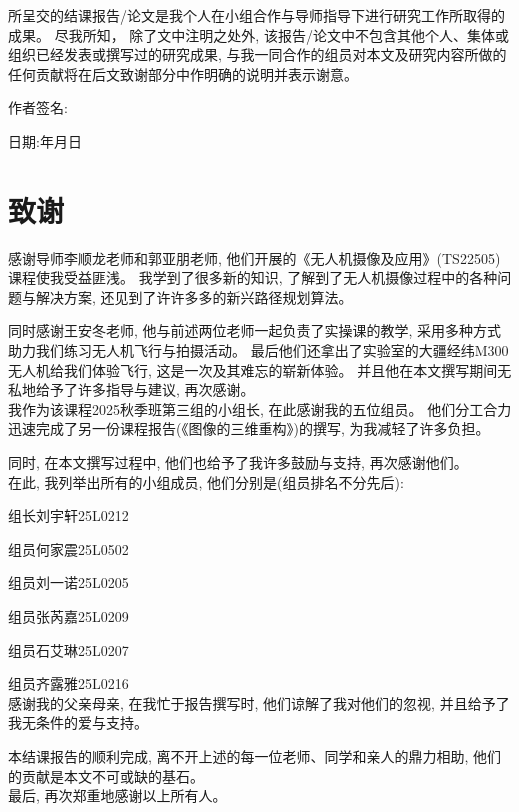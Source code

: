 \documentclass[oneside,UTF8]{ctexart}
\numberwithin{figure}{section} %
\begin{document}
所呈交的结课报告/论文是我个人在小组合作与导师指导下进行研究工作所取得的成果。
尽我所知，
除了文中注明之处外,
该报告/论文中不包含其他个人、集体或组织已经发表或撰写过的研究成果,
与我一同合作的组员对本文及研究内容所做的任何贡献将在后文致谢部分中作明确的说明并表示谢意。

作者签名:

日期:\qquad 年\qquad 月\qquad 日
\newpage\section{致谢}
感谢导师李顺龙老师和郭亚朋老师,
他们开展的《无人机摄像及应用》(TS22505)课程使我受益匪浅。
我学到了很多新的知识,
了解到了无人机摄像过程中的各种问题与解决方案,
还见到了许许多多的新兴路径规划算法。

同时感谢王安冬老师,
他与前述两位老师一起负责了实操课的教学,
采用多种方式助力我们练习无人机飞行与拍摄活动。
最后他们还拿出了实验室的大疆经纬M300无人机给我们体验飞行,
这是一次及其难忘的崭新体验。
并且他在本文撰写期间无私地给予了许多指导与建议,
再次感谢。
~\\

我作为该课程2025秋季班第三组的小组长,
在此感谢我的五位组员。
他们分工合力迅速完成了另一份课程报告(《图像的三维重构》)的撰写,
为我减轻了许多负担。

同时,
在本文撰写过程中,
他们也给予了我许多鼓励与支持,
再次感谢他们。
~\\

在此,
我列举出所有的小组成员,
他们分别是(组员排名不分先后):

\qquad 组长\quad 刘宇轩\quad 25L0212

\qquad 组员\quad 何家震\quad 25L0502

\qquad 组员\quad 刘一诺\quad 25L0205

\qquad 组员\quad 张芮嘉\quad 25L0209

\qquad 组员\quad 石艾琳\quad 25L0207

\qquad 组员\quad 齐露雅\quad 25L0216
~\\

感谢我的父亲母亲,
在我忙于报告撰写时,
他们谅解了我对他们的忽视,
并且给予了我无条件的爱与支持。

本结课报告的顺利完成,
离不开上述的每一位老师、同学和亲人的鼎力相助,
他们的贡献是本文不可或缺的基石。
~\\

最后,
再次郑重地感谢以上所有人。
\end{document}
